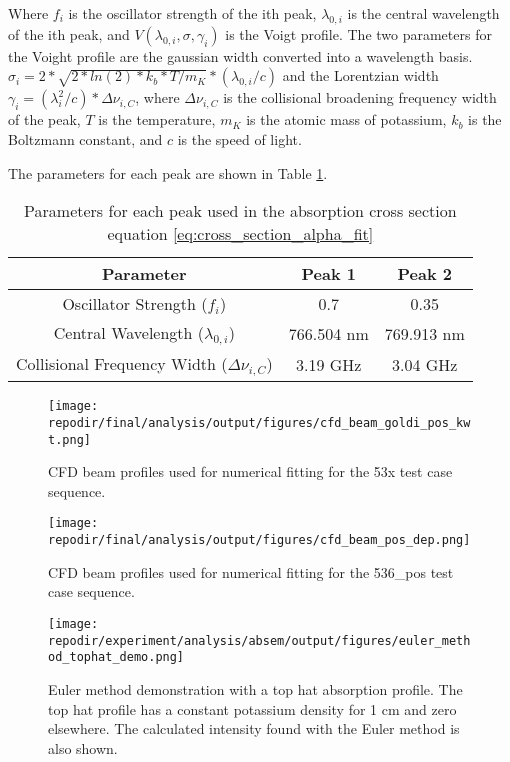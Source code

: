 Where $f_i$ is the oscillator strength of the ith peak, $\lambda_{0,i}$ is the central wavelength of the ith peak, and $V(\lambda_{0,i},\sigma,\gamma_i)$ is the Voigt profile. The two parameters for the Voight profile are the gaussian width converted into a wavelength basis.  $\sigma_i = 2*\sqrt{2*ln(2)*k_b*T/m_K}*(\lambda_{0,i}/c)$ and the Lorentzian width $\gamma_i = (\lambda_i^2/c)*\Delta \nu_{i,C}$, where $\Delta \nu_{i,C}$ is the collisional broadening frequency width of the peak, $T$ is the temperature, $m_K$ is the atomic mass of potassium, $k_b$ is the Boltzmann constant, and $c$ is the speed of light.

The parameters for each peak are shown in Table \ref{table:peak_parameters}. 

\begin{table}[H]
\centering
\begin{tabular}{|c|c|c|}
\hline
Parameter & Peak 1 & Peak 2 \\
\hline
Oscillator Strength ($f_i$) & 0.7 & 0.35 \\
Central Wavelength ($\lambda_{0,i}$) & 766.504 nm & 769.913 nm \\
Collisional Frequency Width ($\Delta \nu_{i,C}$) & 3.19 GHz & 3.04 GHz \\
\hline
\end{tabular}
\caption{Parameters for each peak used in the absorption cross section equation \ref{eq:cross_section_alpha_fit}}
\label{table:peak_parameters}
\end{table}


\begin{figure}[]
    \centering
    \texttt{[image: \\repodir/final/analysis/output/figures/cfd\_beam\_goldi\_pos\_kwt.png]}
    \caption{CFD beam profiles used for numerical fitting for the 53x test case sequence.  }
    \label{fig:SI_cfd_beam_goldi_pos_kwt}

    \texttt{[image: \\repodir/final/analysis/output/figures/cfd\_beam\_pos\_dep.png]}
    \caption{CFD beam profiles used for numerical fitting for the 536\_pos test case sequence.}
    \label{fig:SI_cfd_beam_pos_dep}
\end{figure}


\begin{figure}[]
    \centering
    \texttt{[image: \\repodir/experiment/analysis/absem/output/figures/euler\_method\_tophat\_demo.png]}
    \caption{Euler method demonstration with a top hat absorption profile. The top hat profile has a constant potassium density for 1 cm and zero elsewhere. The calculated intensity found with the Euler method is also shown.}
    \label{fig:SI_euler_method_tophat_demo}
\end{figure}


